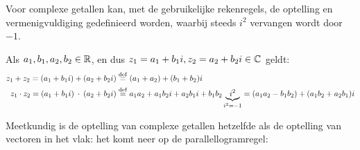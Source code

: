 \documentclass{ximera}
\begin{document}
\begin{exercise}
\begin{question}
\begin{oplossing}
\begin{image}[0.3\textwidth]
            \end{image}
        \end{oplossing}            
    \end{question}        
    \end{exercise}

\nl

Voor complexe getallen kan, met de gebruikelijke rekenregels, de optelling en vermenigvuldiging gedefinieerd worden, waarbij steeds $i^2$ vervangen wordt door $-1$. 

\begin{definition}\nl
	
Als $a_1,b_1,a_2,b_2\in\mathbb{R}$, en dus $z_1=a_1+b_1 i, z_2=a_2+b_2i \in \mathbb{C}$ geldt:
\begin{align*}
z_1+z_2 = (a_1+b_1i)+(a_2+b_2i) & \overset{\mathrm{def}}{=} (a_1+a_2)+(b_1+b_2)i \\
z_1 \cdot z_2 = (a_1+b_1i)\: \cdot \: (a_2+b_2i) & \overset{\mathrm{def}}{=} a_1 a_2+a_1 b_2i+ a_2 b_1i+b_1b_2\underbrace{i^2}_{ i^2=-1} = (a_1 a_2-b_1 b_2)+(a_1 b_2+a_2 b_1)i
\end{align*}

\end{definition}

Meetkundig is de optelling van complexe getallen hetzelfde als de optelling van vectoren in het vlak: het komt neer op de parallellogramregel:
\end{document}
